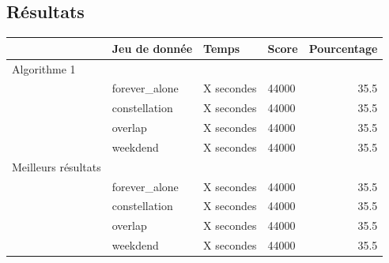 \documentclass[11pt]{article}
\begin{document}
		\subsection{Résultats} %
		\label{sub:résultats}

		\footnotesize
		\hspace*{-1cm}\noindent\begin{tabularx}{16cm}{|l|p{4cm}|X|p{2cm}|r|}
			\hline
			 & \textbf{Jeu de donnée} & \textbf{Temps} & \textbf{Score} & \textbf{Pourcentage} \\
			\hline
		    \cellcolor{blue!25} Algorithme 1 & & & & \\
		    \cellcolor{blue!25} & forever\_alone & X secondes & 44000 & 35.5 \\
		    \cellcolor{blue!25} & constellation & X secondes & 44000 & 35.5 \\
		    \cellcolor{blue!25} & overlap & X secondes & 44000 & 35.5 \\
		    \cellcolor{blue!25} & weekdend & X secondes & 44000 & 35.5 \\
		    \hline
		    \cellcolor{red!25} Meilleurs résultats & & & & \\
		    \cellcolor{red!25} & forever\_alone & X secondes & 44000 & 35.5 \\
		    \cellcolor{red!25} & constellation & X secondes & 44000 & 35.5 \\
		    \cellcolor{red!25} & overlap & X secondes & 44000 & 35.5 \\
		    \cellcolor{red!25} & weekdend & X secondes & 44000 & 35.5 \\
		    \hline
		\end{tabularx}
		\normalsize

\end{document}
